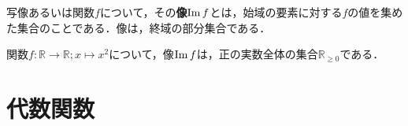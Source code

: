 \begin{definition}[像]
	写像あるいは関数$f$について，その\textbf{像}$\operatorname{Im} f$とは，始域の要素に対する$f$の値を集めた集合のことである．像は，終域の部分集合である．
\end{definition}
\begin{example*}
	関数$f : \mathbb{R} \rightarrow \mathbb{R}; x \mapsto x^2$について，像$\operatorname{Im} f$は，正の実数全体の集合$\mathbb{R}_{\geq 0}$である．
\end{example*}

\section{代数関数}

